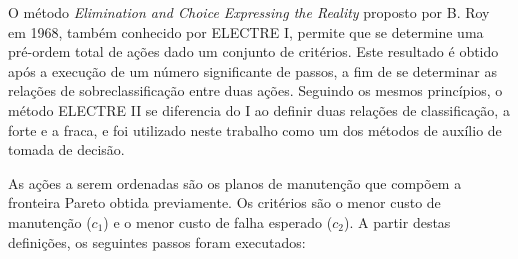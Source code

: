 O método {\it Elimination and Choice Expressing the Reality} proposto por B. Roy em 1968, também conhecido por ELECTRE I, permite que se determine uma pré-ordem total de ações dado um conjunto de critérios. Este resultado é obtido após a execução de um número significante de passos, a fim de se determinar as relações de sobreclassificação entre duas ações. Seguindo os mesmos princípios, o método ELECTRE II se diferencia do I ao definir duas relações de classificação, a forte e a fraca, e  foi utilizado neste trabalho como um dos métodos de auxílio de tomada de decisão.

As ações a serem ordenadas são os planos de manutenção que compõem a fronteira Pareto obtida previamente. Os critérios são o menor custo de manutenção ($c_1$) e o menor custo de falha esperado ($c_2$). A partir destas definições, os seguintes passos foram executados:

